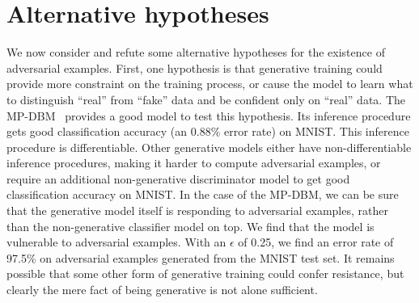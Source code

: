 \documentclass{article} %
\begin{document}
\section{Alternative hypotheses}

We now consider and refute some alternative hypotheses for the existence of adversarial
examples. First, one hypothesis is that generative training could provide more constraint
on the training process, or cause the model to learn what to distinguish ``real'' from ``fake''
data and be confident only on ``real'' data.
The MP-DBM~\citep{mpdbm} provides a good model to test this hypothesis. Its inference procedure gets
good classification accuracy (an 0.88\% error rate) on MNIST. This inference procedure is differentiable.
Other generative models either have non-differentiable inference procedures, making it harder to compute
adversarial examples, or require an additional non-generative discriminator model to get
good classification accuracy on MNIST. In the case of the MP-DBM, we can be sure that the generative
model itself is responding to adversarial examples, rather than the non-generative classifier model
on top. We find that the model is vulnerable to adversarial
examples. With an $\epsilon$ of 0.25, we find an error rate of 97.5\% on adversarial examples generated
from the MNIST test set. It remains possible that some other form of generative training could
confer resistance, but clearly the mere fact of being generative is not alone sufficient.
\end{document}
